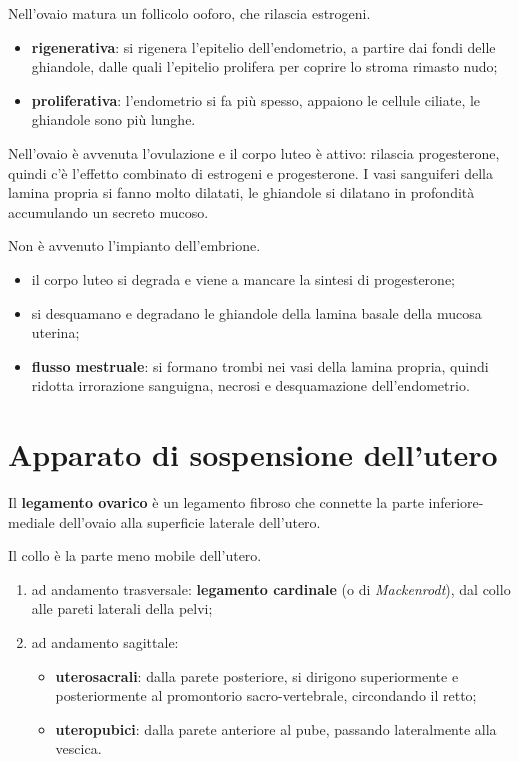 Nell'ovaio matura un follicolo ooforo, che rilascia estrogeni.
\begin{itemize}
  \item \textbf{rigenerativa}: si rigenera l'epitelio dell'endometrio, a partire dai fondi delle
    ghiandole, dalle quali l'epitelio prolifera per coprire lo stroma rimasto nudo;
  \item \textbf{proliferativa}: l'endometrio si fa più spesso, appaiono le cellule ciliate, le
    ghiandole sono più lunghe.
\end{itemize}

Nell'ovaio è avvenuta l'ovulazione e il corpo luteo è attivo: rilascia progesterone, quindi c'è
l'effetto combinato di estrogeni e progesterone. I vasi sanguiferi della lamina propria si fanno
molto dilatati, le ghiandole si dilatano in profondità accumulando un secreto mucoso.

Non è avvenuto l'impianto dell'embrione.
\begin{itemize}
  \item il corpo luteo si degrada e viene a mancare la sintesi di progesterone;
  \item si desquamano e degradano le ghiandole della lamina basale della mucosa uterina;
  \item \textbf{flusso mestruale}: si formano trombi nei vasi della lamina propria, quindi ridotta
    irrorazione sanguigna, necrosi e desquamazione dell'endometrio.
\end{itemize}

\section{Apparato di sospensione dell'utero}

Il \textbf{legamento ovarico} è un legamento fibroso che connette la parte inferiore-mediale
dell'ovaio alla superficie laterale dell'utero.

Il collo è la parte meno mobile dell'utero.

\begin{enumerate}
  \item ad andamento trasversale: \textbf{legamento cardinale} (o di \textit{Mackenrodt}), dal
    collo alle pareti laterali della pelvi;
  \item ad andamento sagittale:
  \begin{itemize}
    \item \textbf{uterosacrali}: dalla parete posteriore, si dirigono superiormente e
      posteriormente al promontorio sacro-vertebrale, circondando il retto;
    \item \textbf{uteropubici}: dalla parete anteriore al pube, passando lateralmente alla
      vescica.
  \end{itemize}
\end{enumerate}

